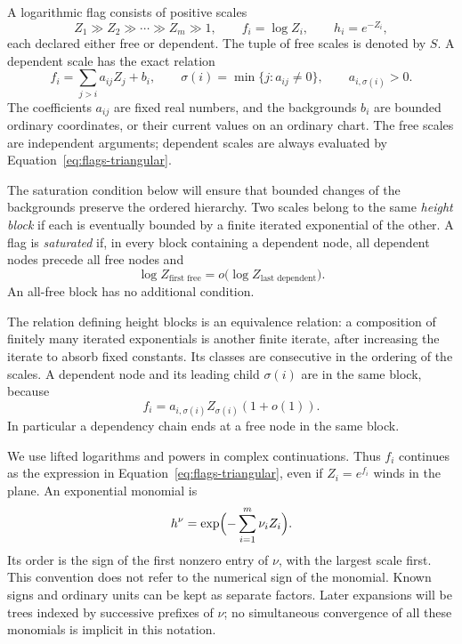 \begin{definition}\label{def:flags-flag}
A logarithmic flag consists of positive scales
\[
 Z_1\gg Z_2\gg\cdots\gg Z_m\gg1,
 \qquad f_i=\log Z_i,\qquad h_i=e^{-Z_i},
\]
each declared either free or dependent. The tuple of free scales is
denoted by $S$. A dependent scale has the exact relation
\begin{equation}\label{eq:flags-triangular}
 f_i=\sum_{j>i}a_{ij}Z_j+b_i,
 \qquad
 \sigma(i)=\min\{j:a_{ij}\ne0\},\qquad a_{i,\sigma(i)}>0.
\end{equation}
The coefficients $a_{ij}$ are fixed real numbers, and the backgrounds
$b_i$ are bounded ordinary coordinates, or their current values on an
ordinary chart. The free scales are independent arguments; dependent
scales are always evaluated by Equation~\eqref{eq:flags-triangular}.

The saturation condition below will ensure that bounded changes of the
backgrounds preserve the ordered hierarchy. Two scales belong to the same
\emph{height block} if each is eventually
bounded by a finite iterated exponential of the other. A flag is
\emph{saturated} if, in every block containing a dependent node, all
dependent nodes precede all free nodes and
\begin{equation}\label{eq:flags-saturated}
 \log Z_{\text{first free}}=o\bigl(\log Z_{\text{last dependent}}\bigr).
\end{equation}
An all-free block has no additional condition.
\end{definition}

The relation defining height blocks is an equivalence relation: a
composition of finitely many iterated exponentials is another finite
iterate, after increasing the iterate to absorb fixed constants. Its
classes are consecutive in the ordering of the scales. A dependent
node and its leading child $\sigma(i)$ are in the same block, because
\[
 f_i=a_{i,\sigma(i)}Z_{\sigma(i)}(1+o(1)).
\]
In particular a dependency chain ends at a free node in the same block.

We use lifted logarithms and powers in complex continuations. Thus
$f_i$ continues as the expression in
Equation~\eqref{eq:flags-triangular}, even if $Z_i=e^{f_i}$ winds in
the plane. An exponential monomial is
\[
 h^\nu=\exp\Bigl(-\sum_{i=1}^m\nu_i Z_i\Bigr).
\]
Its order is the sign of the first nonzero entry of $\nu$, with the
largest scale first. This convention does not refer to the numerical
sign of the monomial. Known signs and ordinary units can be kept as
separate factors. Later expansions will be trees indexed by successive
prefixes of $\nu$; no simultaneous convergence of all these monomials
is implicit in this notation.


